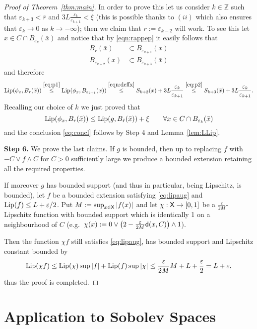 \documentclass[9pt,reqno]{amsart}
\newcommand{\sfd}{{\sf d}}
\newcommand{\X}{{\sf X}}
\newcommand{\Lip}{{\rm Lip}}
\def\ep{\varepsilon}
\begin{document}
\begin{proof}[Proof of Theorem~\ref{thm:main}]
In order to prove this let us consider $k \in \mathbb{Z}$ such that $\ep_{k+3} < \bar r$ and $3L \frac {\ep_k}{\ep_{k+1}} < \xi $ (this is possible thanks to $(ii)$ which also ensures that $\ep_k\to0$ as $k\to-\infty$); then we claim that $r:=\ep_{k-2}$ will work.  To see this let $x\in C\cap B_{\ep_k}(\bar x)$ and notice that by \eqref{eqn:rappep} it easily follows that
\begin{subequations}
\begin{align}
\label{eq:p1}
B_{r}(\bar x)&\subset B_{\ep_{k+1}}(x)\\
\label{eq:p2}
 B_{\ep_{k+2}}(x)&\subset  B_{\ep_{k+3}}(\bar x)
\end{align}
\end{subequations}
and therefore
\[
{\rm Lip}(\phi_x,B_r (\bar{x})) \stackrel{\eqref{eq:p1}}\leq {\rm Lip}(\phi_x, B_{\ep_{k+1}} (x))\stackrel{\eqref{eqn:deffx}} \leq S_{k+2}(x) + 3L \frac {\ep_k}{\ep_{k+1}} \stackrel{\eqref{eq:p2}}\leq S_{k+3}(\bar{x}) +3L \frac {\ep_k}{\ep_{k+1}}. 
\]
Recalling our choice of $k$ we just proved that
\[
{\rm Lip}(\phi_x,B_r (\bar{x})) \leq{\rm Lip}(g,B_{\bar{r}} (\bar{x}))  +\xi\qquad\forall x\in C\cap B_{\ep_k}(\bar x)
\]
and the conclusion \eqref{eq:concl} follows by   Step 4 and  Lemma~\ref{lem:LLip}.


\vspace{10pt}


\noindent \textbf{Step 6.} We prove the last claims. If $g$ is bounded, then up to replacing $f$ with $-C\vee f\wedge C$ for $C>0$ sufficiently large we produce a bounded extension retaining all the required properties.

If moreover $g$ has bounded support (and thus in particular, being Lipschitz, is bounded), let $f$ be a bounded  extension satisfying \eqref{eq:lipaug} and $\Lip(f)\leq L+\ep/2$. Put $M:=\sup_{x\in\X}|f(x)|$ and let $\chi:\X\to[0,1]$ be a $\frac\ep {2M}$-Lipschitz function with bounded support which is identically 1 on a neighbourhood of $C$ (e.g.\ $\chi(x):=0\vee \big(2-\tfrac\ep {2M}\sfd(x,C)\big)\wedge 1
$).

Then the function $\chi f$ still satisfies \eqref{eq:lipaug}, has bounded support and Lipschitz constant bounded by
\[
\Lip(\chi f)\leq \Lip(\chi)\sup|f|+\Lip(f)\sup|\chi|\leq \frac\ep{2M}M+L+\frac\ep2=L+\ep,
\]
thus the proof is completed.
\end{proof}
\section{Application to Sobolev Spaces}
\end{document}
